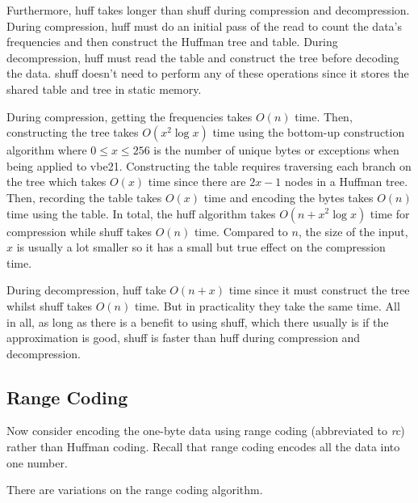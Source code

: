 Furthermore, huff takes longer than shuff during compression and decompression.
During compression, huff must do an initial pass of the read to count the data's frequencies and then construct the Huffman tree and table.
During decompression, huff must read the table and construct the tree before decoding the data.
shuff doesn't need to perform any of these operations since it stores the shared table and tree in static memory.

During compression, getting the frequencies takes $O(n)$ time. Then, constructing the tree takes $O(x^2\log x)$ time using the bottom-up construction algorithm where $0\le x \le 256$ is the number of unique bytes or exceptions when being applied to vbe21. Constructing the table requires traversing each branch on the tree which takes $O(x)$ time since there are $2x-1$ nodes in a Huffman tree. Then, recording the table takes $O(x)$ time and encoding the bytes takes $O(n)$ time using the table. In total, the huff algorithm takes $O(n + x^2\log x)$ time for compression while shuff takes $O(n)$ time. Compared to $n$, the size of the input, $x$ is usually a lot smaller so it has a small but true effect on the compression time.

During decompression, huff take $O(n + x)$ time since it must construct the tree whilst shuff takes $O(n)$ time. But in practicality they take the same time. All in all, as long as there is a benefit to using shuff, which there usually is if the approximation is good, shuff is faster than huff during compression and decompression.



\subsection{Range Coding}

Now consider encoding the one-byte data using range coding (abbreviated to \textit{rc}) rather than Huffman coding. Recall that range coding encodes all the data into one number.

There are variations on the range coding algorithm.
